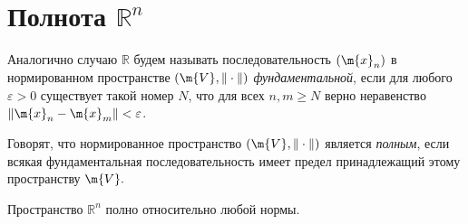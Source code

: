 \section{Полнота $\mathbb{R}^n$}


Аналогично случаю $\mathbb{R}$ будем называть последовательность $(\m{x}_n)$ в нормированном пространстве $(\m{V}, \| \cdot \|)$ \textit{фундаментальной}, если для любого $\varepsilon>0$ существует такой номер $N$, что для всех $n,m \ge N$ верно неравенство $\| \m{x}_n - \m{x}_m\| < \varepsilon$.

\begin{definition}
    Говорят, что нормированное пространство $(\m{V}, \| \cdot \|)$ является \textit{полным}, если всякая фундаментальная последовательность имеет предел принадлежащий этому пространству $\m{V}.$
\end{definition}

\begin{theorem}
Пространство $\mathbb{R}^n$ полно относительно любой нормы.
\end{theorem}


